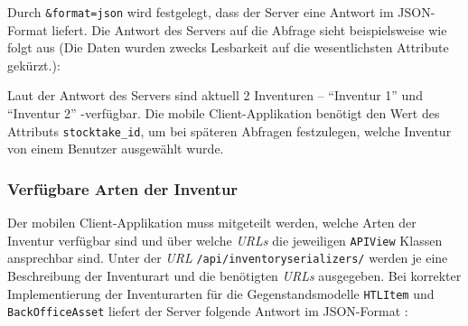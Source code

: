 \begin{Shaded}
\begin{Highlighting}[]
\NormalTok{/}\KeywordTok{&}\KeywordTok{&}
\end{Highlighting}
\end{Shaded}

Durch \texttt{\&format=json} wird festgelegt, dass der Server eine
Antwort im JSON-Format \cite{json-format-doku} liefert. Die Antwort des
Servers auf die Abfrage sieht beispielsweise wie folgt aus (Die Daten
wurden zwecks Lesbarkeit auf die wesentlichsten Attribute gekürzt.):

\begin{Shaded}
\begin{Highlighting}[]
\OtherTok{[}
    \FunctionTok{\{}
        \FunctionTok{:} \FunctionTok{,}
        \FunctionTok{:} \FunctionTok{,}
        \FunctionTok{:} \FunctionTok{,}
        \FunctionTok{:} \FunctionTok{,}
    \FunctionTok{\}}\OtherTok{,}
    \FunctionTok{\{}
        \FunctionTok{:} \FunctionTok{,}
        \FunctionTok{:} \FunctionTok{,}
        \FunctionTok{:} \FunctionTok{,}
        \FunctionTok{:} \FunctionTok{,}
    \FunctionTok{\}}
\OtherTok{]}
\end{Highlighting}
\end{Shaded}

Laut der Antwort des Servers sind aktuell 2 Inventuren -- ``Inventur 1''
und ``Inventur 2'' -verfügbar. Die mobile Client-Applikation benötigt
den Wert des Attributs \texttt{stocktake\_id}, um bei späteren Abfragen
festzulegen, welche Inventur von einem Benutzer ausgewählt wurde.

\subsubsection*{Verfügbare Arten der Inventur}

Der mobilen Client-Applikation muss mitgeteilt werden, welche Arten der
Inventur verfügbar sind und über welche \emph{URLs}
 die jeweiligen
\texttt{APIView} Klassen ansprechbar sind. Unter der \emph{URL}
\texttt{/api/inventoryserializers/} werden je eine Beschreibung der
Inventurart und die benötigten \emph{URLs}
 ausgegeben. Bei
korrekter Implementierung der Inventurarten für die Gegenstandsmodelle
\texttt{HTLItem} und \texttt{BackOfficeAsset} liefert der Server
folgende Antwort im JSON-Format \cite{json-format-doku}:

